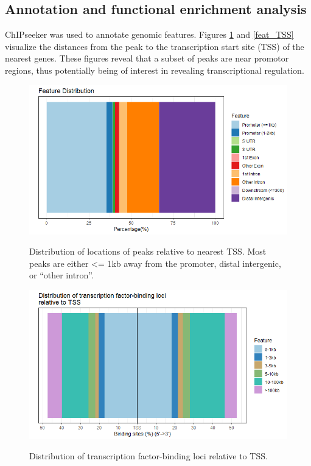 \documentclass{article}
\begin{document}
\subsection{Annotation and functional enrichment analysis}
ChIPseeker\cite{yu2015chipseeker} was used to annotate genomic features. Figures \ref{fig:feat_dist} and \ref{feat_TSS} visualize the distances from the peak to the transcription start site (TSS) of the nearest genes. These figures reveal that a subset of peaks are near promotor regions, thus potentially being of interest in revealing transcriptional regulation. 

\begin{figure}[h]
\caption{Distribution of locations of peaks relative to nearest TSS. Most peaks are either <= 1kb away from the promoter, distal intergenic, or "`other intron"'.}
\centering
\includegraphics[width=\textwidth]{feature_distribution.png}
\label{fig:feat_dist}
\end{figure}

\begin{figure}[h]
\caption{Distribution of transcription factor-binding loci relative to TSS.}
\centering
\includegraphics[width=\textwidth]{feature_distribution_TSS.png}
\label{fig:feat_TSS}
\end{figure}
\end{document}
